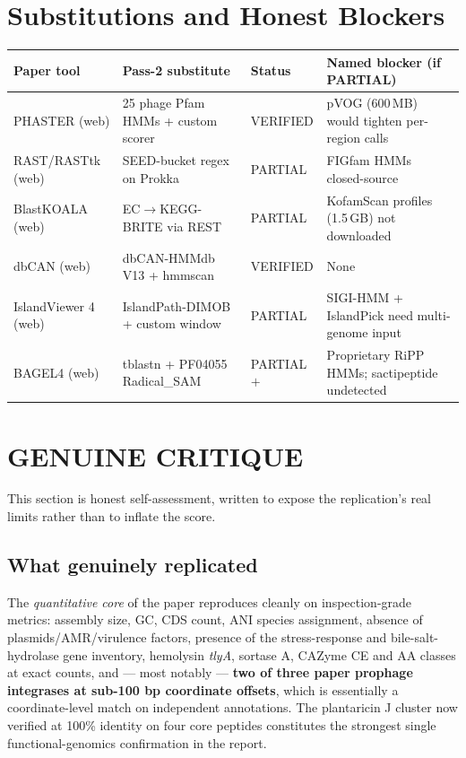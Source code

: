 \documentclass[11pt]{article}
\begin{document}
\section{Substitutions and Honest Blockers}
\begin{center}
\begin{tabular}{@{}p{4cm}p{5cm}p{2cm}p{4cm}@{}}
\toprule
Paper tool & Pass-2 substitute & Status & Named blocker (if PARTIAL) \\
\midrule
PHASTER (web) & 25 phage Pfam HMMs + custom scorer & VERIFIED & pVOG (600\,MB) would tighten per-region calls \\
RAST/RASTtk (web) & SEED-bucket regex on Prokka & PARTIAL & FIGfam HMMs closed-source \\
BlastKOALA (web) & EC$\rightarrow$KEGG-BRITE via REST & PARTIAL & KofamScan profiles (1.5\,GB) not downloaded \\
dbCAN (web) & dbCAN-HMMdb V13 + hmmscan & VERIFIED & None \\
IslandViewer 4 (web) & IslandPath-DIMOB + custom window & PARTIAL & SIGI-HMM + IslandPick need multi-genome input \\
BAGEL4 (web) & tblastn + PF04055 Radical\_SAM & PARTIAL$+$ & Proprietary RiPP HMMs; sactipeptide undetected \\
\bottomrule
\end{tabular}
\end{center}

\section{GENUINE CRITIQUE}
This section is honest self-assessment, written to expose the replication's real limits rather than to inflate the score.

\subsection*{What genuinely replicated}
The \emph{quantitative core} of the paper reproduces cleanly on inspection-grade metrics: assembly size, GC, CDS count, ANI species assignment, absence of plasmids/AMR/virulence factors, presence of the stress-response and bile-salt-hydrolase gene inventory, hemolysin \emph{tlyA}, sortase A, CAZyme CE and AA classes at exact counts, and --- most notably --- \textbf{two of three paper prophage integrases at sub-100 bp coordinate offsets}, which is essentially a coordinate-level match on independent annotations. The plantaricin J cluster now verified at 100\% identity on four core peptides constitutes the strongest single functional-genomics confirmation in the report.
\end{document}
